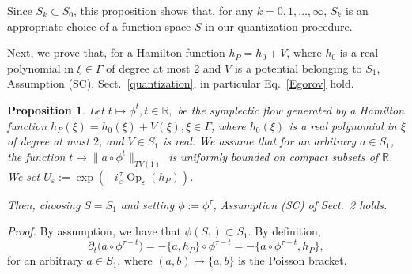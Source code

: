 \documentclass[11pt]{article}
\DeclareMathOperator{\Op}{Op}
\newtheorem{proposition}[theorem]{Proposition}
\begin{document}
\vspace{0.15cm}Since $S_k\subset S_0$, this proposition shows that, for any $k=0,1,\dotsc,\infty$, $S_k$ is an appropriate choice 
of a function space $S$ in our quantization procedure.

\medskip
Next, we prove that, for a Hamilton function $h_P=h_0+V$, where $h_0$ is a real polynomial in $\xi\in \Gamma$ 
of degree at most $2$ and $V$ is a potential belonging to $S_1$, Assumption (SC), Sect.~\ref{quantization}, in particular 
Eq.~\eqref{Egorov} hold.
\begin{proposition}
	Let $t\mapsto \phi^t, t\in \mathbb{R},$ be the symplectic flow generated by a Hamilton function 
	$h_{P}(\xi) = h_0(\xi)+V(\xi), \xi \in \Gamma$,
	 where $h_0(\xi)$ is a real polynomial in $\xi$ of degree at most $2$, and $V\in S_1$ is real. We assume that for an arbitrary
	 $a\in S_1$, the function $t\mapsto\|a\circ\phi^t\|_{TV(1)}$ is uniformly bounded on compact subsets of $\mathbb{R}$.
	 We set $U_\varepsilon:=\exp\left(-i\frac{\tau}{\varepsilon} \Op_\varepsilon(h_P)\right)$.
	 
	 Then, choosing $S=S_1$ and setting $\phi:=\phi^{\tau}$, Assumption (SC) of Sect.~2 holds. \end{proposition}

\noindent \textit{Proof.} By assumption, we have that $\phi(S_1)\subset S_1$. By definition,  
	$$\partial_t \big(a\circ\phi^{\tau-t}\big)=-\{a,h_P\}\circ\phi^{\tau-t}=-\{a\circ\phi^{\tau-t},h_P\},$$ 
	for an arbitrary $a\in S_1$, where $(a,b)\mapsto\{a,b\}$ is the Poisson bracket. 
	
\end{document}
